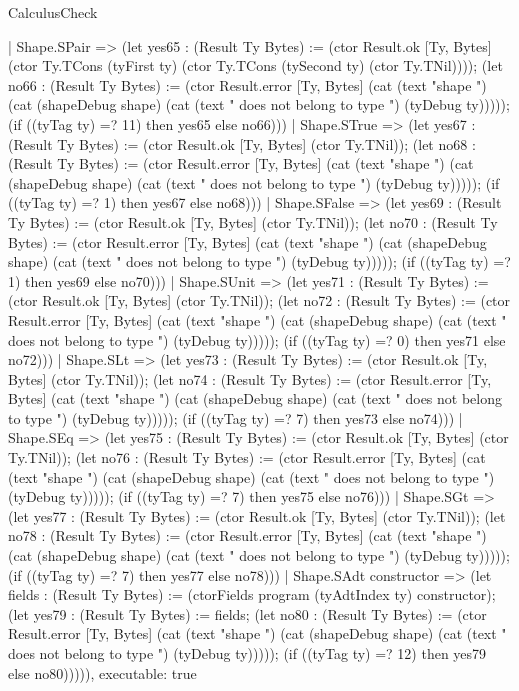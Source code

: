 \begin{lexlean}{CalculusCheck}
\begin{semanticmodule}
{    | Shape.SPair => (let yes65 : (Result Ty Bytes) := (ctor Result.ok [Ty, Bytes] (ctor Ty.TCons (tyFirst ty) (ctor Ty.TCons (tySecond ty) (ctor Ty.TNil)))); (let no66 : (Result Ty Bytes) := (ctor Result.error [Ty, Bytes] (cat (text "shape ") (cat (shapeDebug shape) (cat (text " does not belong to type ") (tyDebug ty))))); (if ((tyTag ty) =? 11) then yes65 else no66)))
    | Shape.STrue => (let yes67 : (Result Ty Bytes) := (ctor Result.ok [Ty, Bytes] (ctor Ty.TNil)); (let no68 : (Result Ty Bytes) := (ctor Result.error [Ty, Bytes] (cat (text "shape ") (cat (shapeDebug shape) (cat (text " does not belong to type ") (tyDebug ty))))); (if ((tyTag ty) =? 1) then yes67 else no68)))
    | Shape.SFalse => (let yes69 : (Result Ty Bytes) := (ctor Result.ok [Ty, Bytes] (ctor Ty.TNil)); (let no70 : (Result Ty Bytes) := (ctor Result.error [Ty, Bytes] (cat (text "shape ") (cat (shapeDebug shape) (cat (text " does not belong to type ") (tyDebug ty))))); (if ((tyTag ty) =? 1) then yes69 else no70)))
    | Shape.SUnit => (let yes71 : (Result Ty Bytes) := (ctor Result.ok [Ty, Bytes] (ctor Ty.TNil)); (let no72 : (Result Ty Bytes) := (ctor Result.error [Ty, Bytes] (cat (text "shape ") (cat (shapeDebug shape) (cat (text " does not belong to type ") (tyDebug ty))))); (if ((tyTag ty) =? 0) then yes71 else no72)))
    | Shape.SLt => (let yes73 : (Result Ty Bytes) := (ctor Result.ok [Ty, Bytes] (ctor Ty.TNil)); (let no74 : (Result Ty Bytes) := (ctor Result.error [Ty, Bytes] (cat (text "shape ") (cat (shapeDebug shape) (cat (text " does not belong to type ") (tyDebug ty))))); (if ((tyTag ty) =? 7) then yes73 else no74)))
    | Shape.SEq => (let yes75 : (Result Ty Bytes) := (ctor Result.ok [Ty, Bytes] (ctor Ty.TNil)); (let no76 : (Result Ty Bytes) := (ctor Result.error [Ty, Bytes] (cat (text "shape ") (cat (shapeDebug shape) (cat (text " does not belong to type ") (tyDebug ty))))); (if ((tyTag ty) =? 7) then yes75 else no76)))
    | Shape.SGt => (let yes77 : (Result Ty Bytes) := (ctor Result.ok [Ty, Bytes] (ctor Ty.TNil)); (let no78 : (Result Ty Bytes) := (ctor Result.error [Ty, Bytes] (cat (text "shape ") (cat (shapeDebug shape) (cat (text " does not belong to type ") (tyDebug ty))))); (if ((tyTag ty) =? 7) then yes77 else no78)))
    | Shape.SAdt constructor => (let fields : (Result Ty Bytes) := (ctorFields program (tyAdtIndex ty) constructor); (let yes79 : (Result Ty Bytes) := fields; (let no80 : (Result Ty Bytes) := (ctor Result.error [Ty, Bytes] (cat (text "shape ") (cat (shapeDebug shape) (cat (text " does not belong to type ") (tyDebug ty))))); (if ((tyTag ty) =? 12) then yes79 else no80))))),
  executable: true
}


\end{semanticmodule}
\end{lexlean}
